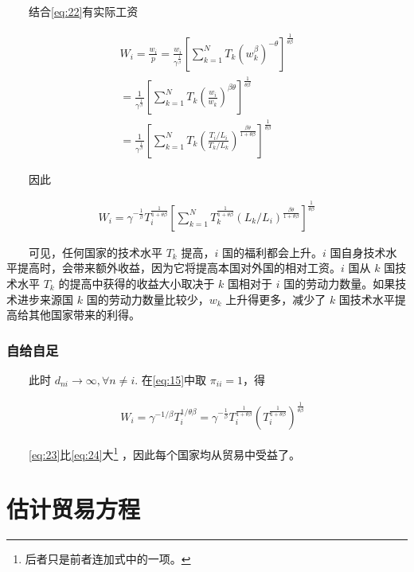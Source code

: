 \documentclass[
]{article}
\begin{document}
　　结合\eqref{eq:22}有实际工资

\[
\begin{array}{l}{W_{i}=\frac{w_{i}}{p}=\frac{w_{i}}{\gamma^{\frac{1}{\beta}}}\left[\sum_{k=1}^{N} T_{k}\left(w_{k}^{\beta}\right)^{-\theta}\right]^{\frac{1}{\theta \beta}}} \\ {=\frac{1}{\gamma^{\frac{1}{\beta}}}\left[\sum_{k=1}^{N} T_{k}\left(\frac{w_{i}}{w_{k}}\right)^{\beta \theta}\right]^{\frac{1}{\theta \beta}}} \\ {=\frac{1}{\gamma^{\frac{1}{\beta}}}\left[\sum_{k=1}^{N} T_{k}\left(\frac{T_{i} / L_{i}}{T_{k} / L_{k}}\right)^{\frac{\beta \theta}{1+\theta \beta}}\right]^{\frac{1}{\theta \beta}}}\end{array}
\]

　　因此

\begin{align}
W_{i}=\gamma^{-\frac{1}{\beta}} T_{i}^{\frac{1}{1+\theta \beta}}\left[\sum_{k=1}^{N} T_{k}^{\frac{1}{1+\theta \beta}}\left(L_{k} / L_{i}\right)^{\frac{\beta \theta}{1+\theta \beta}}\right]^{\frac{1}{\theta \beta}} \label{eq:23}
\end{align}

　　可见，任何国家的技术水平 \(T_k\) 提高，\(i\) 国的福利都会上升。\(i\) 国自身技术水平提高时，会带来额外收益，因为它将提高本国对外国的相对工资。\(i\) 国从 \(k\) 国技术水平 \(T_k\) 的提高中获得的收益大小取决于 \(k\) 国相对于 \(i\) 国的劳动力数量。如果技术进步来源国 \(k\) 国的劳动力数量比较少，\(w_k\) 上升得更多，减少了 \(k\) 国技术水平提高给其他国家带来的利得。

\hypertarget{ux81eaux7ed9ux81eaux8db3}{%
\subsubsection{自给自足}\label{ux81eaux7ed9ux81eaux8db3}}

　　此时 \(d_{n i} \rightarrow \infty, \forall n \neq i\). 在\eqref{eq:15}中取 \(\pi_{ii}=1\)，得

\begin{align}
\quad W_{i}=\gamma^{-1 / \beta} T_{i}^{1 / \theta \beta}=\gamma^{-\frac{1}{\beta}} T_{i}^{\frac{1}{1+\theta \beta}}\left(T_{i}^{\frac{1}{1+\theta \beta}}\right)^{\frac{1}{\theta \beta}} \label{eq:24}
\end{align}

　　\eqref{eq:23}比\eqref{eq:24}大\footnote{后者只是前者连加式中的一项。} ，因此每个国家均从贸易中受益了。

\hypertarget{ux4f30ux8ba1ux8d38ux6613ux65b9ux7a0b}{%
\section{估计贸易方程}\label{ux4f30ux8ba1ux8d38ux6613ux65b9ux7a0b}}
\end{document}
